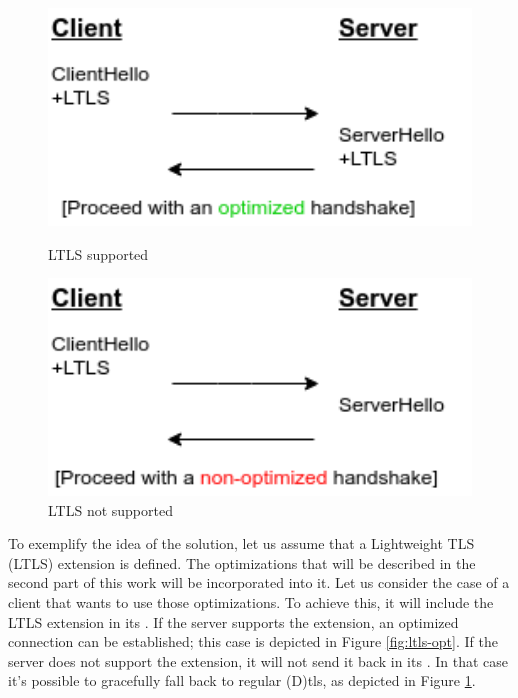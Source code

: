 \documentclass{llncs}
\begin{document}
{%
\begin{figure}
    \centering
    \begin{minipage}{0.5\textwidth}
        \centering
        \includegraphics[width=1.0\textwidth]{img/optimized-handshake.png} %
        \caption{\label{fig:ltls-opt} LTLS supported}
    \end{minipage}\hfill
    \begin{minipage}{0.5\textwidth}
        \centering
        \includegraphics[width=1.0\textwidth]{img/non-optimized-handshake.png} %
        \caption{\label{fig:ltls-non-opt} LTLS not supported}
    \end{minipage}
\end{figure}

To exemplify the idea of the solution, let us assume that a
Lightweight TLS (LTLS) extension is defined. The optimizations that will be described in the second part of this work will be incorporated into it. Let us consider the case of a client that wants to use those
optimizations. To achieve this, it will include the LTLS extension in its
. If the server supports the extension, an
optimized connection can be established; this case is depicted in Figure \ref{fig:ltls-opt}. If the server does not support the extension, it will not
send it back in its . In that case it's possible
to gracefully fall back to regular (D)\gls{tls}, as depicted in Figure \ref{fig:ltls-non-opt}.

}
\end{document}
